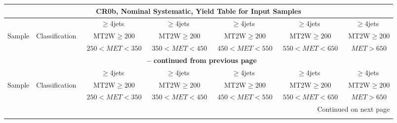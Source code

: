 \documentclass{article}
\begin{document}
 
 
 
 
\pagebreak 

 
 
 
 
\begin{longtable}{|l|c|c|c|c|c|c|} 
 
\multicolumn{7}{c}{ CR0b, Nominal Systematic, Yield Table for Input Samples }\\* \hline 
 &  & $\ge$4jets  & $\ge$4jets  & $\ge$4jets  & $\ge$4jets  & $\ge$4jets \\* 
Sample & Classification  & ~MT2W$\ge200$  & ~MT2W$\ge200$  & ~MT2W$\ge200$  & ~MT2W$\ge200$  & ~MT2W$\ge200$ \\* 
 &  & ~$250<MET<350$  & ~$350<MET<450$  & ~$450<MET<550$  & ~$550<MET<650$  & ~$MET>650$ \\* 
\hline \hline 
\endfirsthead 
 
\multicolumn{7}{c}{{\bfseries \tablename\ \thetable{} -- continued from previous page}}\\* \hline 
 &  & $\ge$4jets  & $\ge$4jets  & $\ge$4jets  & $\ge$4jets  & $\ge$4jets \\* 
Sample & Classification  & ~MT2W$\ge200$  & ~MT2W$\ge200$  & ~MT2W$\ge200$  & ~MT2W$\ge200$  & ~MT2W$\ge200$ \\* 
 &  & ~$250<MET<350$  & ~$350<MET<450$  & ~$450<MET<550$  & ~$550<MET<650$  & ~$MET>650$ \\* 
\hline \hline 
\endhead 
 
\multicolumn{7}{|r|}{{Continued on next page}}\\* \hline 
\endfoot 
 
 
\endlastfoot 
 

\end{longtable}
\end{document}
